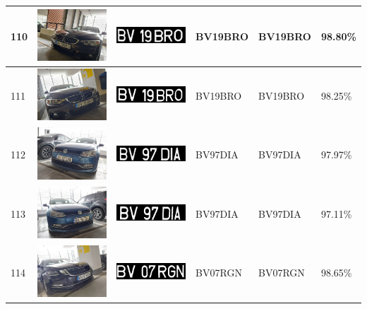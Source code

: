 \documentclass[a4paper,12pt]{report}
\begin{document}
\begin{longtable}{| m{0.6cm} | m{3cm} | m{3cm} | m{1.8cm} | m{1.8cm} | m{1.8cm} |}
        110 & \includegraphics[width=3cm,keepaspectratio]{dataset/64_d1.jpg} & \includegraphics[width=3cm,keepaspectratio]{segmentari/110.jpg} & BV19BRO & BV19BRO & 98.80\% \\ \hline
        111 & \includegraphics[width=3cm,keepaspectratio]{dataset/64_s1.jpg} & \includegraphics[width=3cm,keepaspectratio]{segmentari/111.jpg} & BV19BRO & BV19BRO & 98.25\% \\ \hline
        112 & \includegraphics[width=3cm,keepaspectratio]{dataset/65_d1.jpg} & \includegraphics[width=3cm,keepaspectratio]{segmentari/112.jpg} & BV97DIA & BV97DIA & 97.97\% \\ \hline
        113 & \includegraphics[width=3cm,keepaspectratio]{dataset/65_s1.jpg} & \includegraphics[width=3cm,keepaspectratio]{segmentari/113.jpg} & BV97DIA & BV97DIA & 97.11\% \\ \hline
        114 & \includegraphics[width=3cm,keepaspectratio]{dataset/66_s1.jpg} & \includegraphics[width=3cm,keepaspectratio]{segmentari/114.jpg} & BV07RGN & BV07RGN & 98.65\% \\ \hline

\end{longtable}
\end{document}
